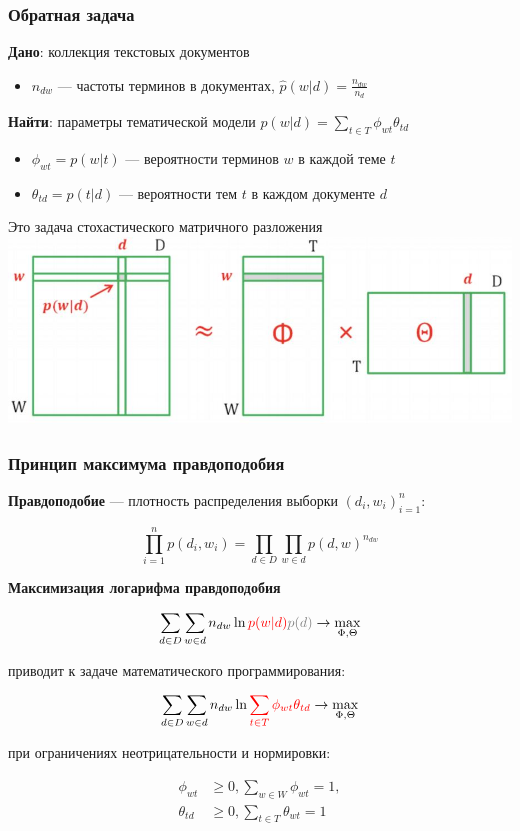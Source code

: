 \documentclass[fullscreen=true, bookmarks=true, hyperref={pdfencoding=unicode}]{beamer}
\begin{document}
\begin{frame}
  \frametitle{Обратная задача}

  {\bf Дано}: коллекция текстовых документов

  \begin{itemize}
    \item $n_{dw}$ — частоты терминов в документах,  $\hat p (w | d) = \frac{n_{dw}}{n_{d}}$
  \end{itemize}

  {\bf Найти}: параметры тематической модели  $p(w|d) = \sum\limits_{t \in T} \phi_{wt} \theta_{td}$

  \begin{itemize}
    \item $\phi_{wt} = p(w|t)$ — вероятности терминов $w$ в каждой теме $t$
    \item $\theta_{td} = p(t|d)$ — вероятности тем $t$ в каждом документе $d$
  \end{itemize}

  \begin{center}
    Это задача стохастического матричного разложения
    \includegraphics[keepaspectratio,
                     width=.6\paperwidth]{matrix_decomposition.jpg}
  \end{center}
\end{frame}


\begin{frame}
  \frametitle{Принцип максимума правдоподобия}

  {\bf Правдоподобие} — плотность распределения выборки $(d_i, w_i)_{i=1}^n$:

  $$\prod\limits_{i=1}^n p(d_i, w_i) = \prod\limits_{d \in D} \prod\limits_{w \in d} p(d, w)^{n_{dw}} $$

  {\bf Максимизация логарифма правдоподобия}

  $$\sum\limits_{d \in D} \sum\limits_{w \in d} n_{dw} \ln{\color{red}p(w|d)}{\color{gray}p(d)} \to \max\limits_{\Phi, \Theta} $$

  приводит к задаче математического программирования:

  $$\sum\limits_{d \in D} \sum\limits_{w \in d} n_{dw} \ln{\color{red}\sum\limits_{t\in T} \phi_{wt}\theta_{td}} \to \max\limits_{\Phi, \Theta} $$

  при ограничениях неотрицательности и нормировки:

  \begin{align*}
    \phi_{wt} &\geq 0, \sum\limits_{w \in W}\phi_{wt} = 1, \\
    \theta_{td} &\geq 0, \sum\limits_{t \in T}\theta_{wt} = 1
  \end{align*}
 \end{frame}
\end{document}
